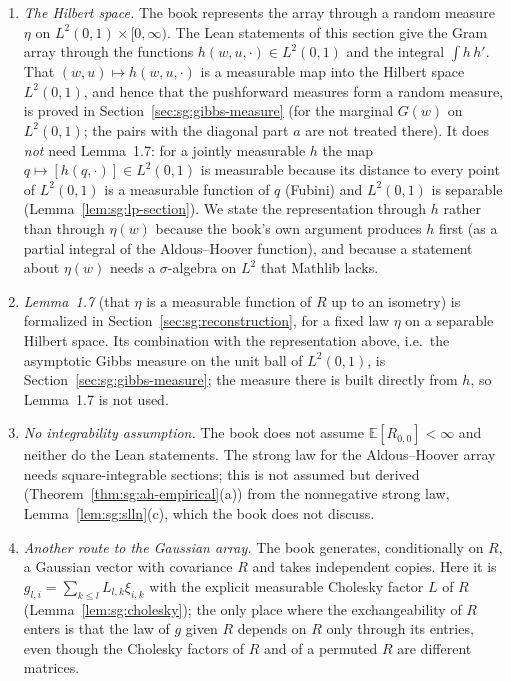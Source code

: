 \begin{remark}\label{rem:sg:dovbysh-sudakov-deviation}
\begin{enumerate}
\item \emph{The Hilbert space.} The book represents the array through a random measure $\eta$ on $L^2(0,1)\times[0,\infty)$. The Lean statements of this section give the Gram array through the functions $h(w,u,\cdot)\in L^2(0,1)$ and the integral $\int h\,h'$. That $(w,u)\mapsto h(w,u,\cdot)$ is a measurable map into the Hilbert space $L^2(0,1)$, and hence that the pushforward measures form a random measure, is proved in Section~\ref{sec:sg:gibbs-measure} (for the marginal $G(w)$ on $L^2(0,1)$; the pairs with the diagonal part $a$ are not treated there). It does \emph{not} need Lemma~1.7: for a jointly measurable $h$ the map $q\mapsto[h(q,\cdot)]\in L^2(0,1)$ is measurable because its distance to every point of $L^2(0,1)$ is a measurable function of $q$ (Fubini) and $L^2(0,1)$ is separable (Lemma~\ref{lem:sg:lp-section}). We state the representation through $h$ rather than through $\eta(w)$ because the book's own argument produces $h$ first (as a partial integral of the Aldous--Hoover function), and because a statement about $\eta(w)$ needs a $\sigma$-algebra on $L^2$ that Mathlib lacks.
\item \emph{Lemma~1.7} (that $\eta$ is a measurable function of $R$ up to an isometry) is formalized in Section~\ref{sec:sg:reconstruction}, for a fixed law $\eta$ on a separable Hilbert space. Its combination with the representation above, i.e.\ the asymptotic Gibbs measure on the unit ball of $L^2(0,1)$, is Section~\ref{sec:sg:gibbs-measure}; the measure there is built directly from $h$, so Lemma~1.7 is not used.
\item \emph{No integrability assumption.} The book does not assume $\mathbb E[R_{0,0}]<\infty$ and neither do the Lean statements. The strong law for the Aldous--Hoover array needs square-integrable sections; this is not assumed but derived (Theorem~\ref{thm:sg:ah-empirical}(a)) from the nonnegative strong law, Lemma~\ref{lem:sg:slln}(c), which the book does not discuss.
\item \emph{Another route to the Gaussian array.} The book generates, conditionally on $R$, a Gaussian vector with covariance $R$ and takes independent copies. Here it is $g_{l,i}=\sum_{k\le l}L_{l,k}\xi_{i,k}$ with the explicit measurable Cholesky factor $L$ of $R$ (Lemma~\ref{lem:sg:cholesky}); the only place where the exchangeability of $R$ enters is that the law of $g$ given $R$ depends on $R$ only through its entries, even though the Cholesky factors of $R$ and of a permuted $R$ are different matrices.

\end{enumerate}
\end{remark}
